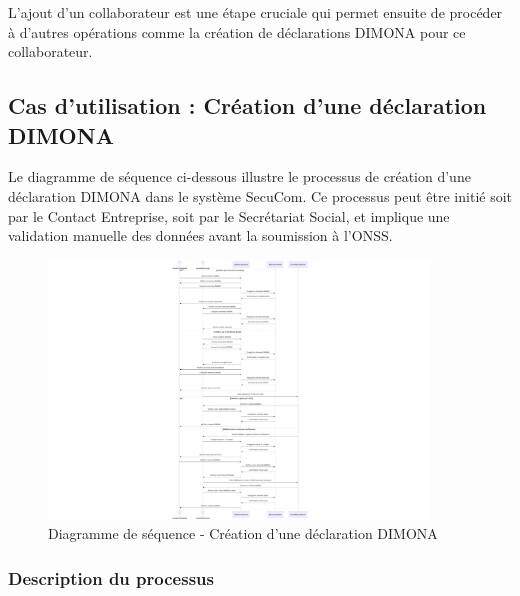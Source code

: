 L'ajout d'un collaborateur est une étape cruciale qui permet ensuite de procéder à d'autres opérations comme la création de déclarations DIMONA pour ce collaborateur.

\subsection{Cas d'utilisation : Création d'une déclaration DIMONA}

Le diagramme de séquence ci-dessous illustre le processus de création d'une déclaration DIMONA dans le système SecuCom. Ce processus peut être initié soit par le Contact Entreprise, soit par le Secrétariat Social, et implique une validation manuelle des données avant la soumission à l'ONSS.

\begin{figure}[h]
\centering
\includegraphics[width=0.9\textwidth]{SD_creation_dimona.png}
\caption{Diagramme de séquence - Création d'une déclaration DIMONA}
\end{figure}

\subsubsection{Description du processus}

